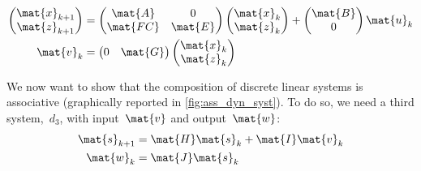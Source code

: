 \begin{equation*}
    \label{eq:dlin-3}
    \begin{aligned}
        \begin{pmatrix}
            \mat{x}_{k+1} \\
            \mat{z}_{k+1}
        \end{pmatrix}&=
        \begin{pmatrix}
            \mat{A}  & 0       \\
            \mat{FC} & \mat{E}
        \end{pmatrix}\begin{pmatrix}
                         \mat{x}_k\\ \mat{z}_k
        \end{pmatrix}+
        \begin{pmatrix}
            \mat{B}\\ 0
        \end{pmatrix}\mat{u}_k\\
        \mat{v}_k&=\begin{pmatrix}
                       0& \mat{G}
        \end{pmatrix} \begin{pmatrix}
                          \mat{x}_k \\ \mat{z}_k
        \end{pmatrix}
    \end{aligned}
\end{equation*}

We now want to show that the composition of discrete linear systems is associative (graphically reported in \cref{fig:ass_dyn_syst}). To do so, we need a third system,~$d_3$, with input~$\mat{v}$ and output~$\mat{w}$:
\begin{equation*}
    \label{eq:dlin-4}
    \begin{aligned}
        \mat{s}_{k+1} &= \mat{H} \mat{s}_k + \mat{I} \mat{v}_k \\
        \mat{w}_{k}   &= \mat{J} \mat{s}_k
    \end{aligned}
\end{equation*}

